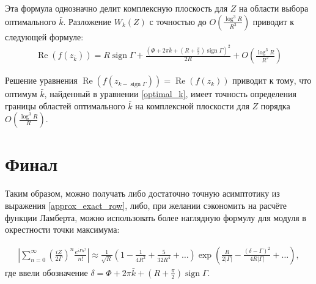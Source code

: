 \documentclass[a4paper, 12pt]{article}
\DeclareMathOperator*{\sign}{sign}
\DeclareMathOperator*{\Real}{Re}
\newenvironment{eqw}{\begin{equation} \begin{aligned}}   
    {\end{aligned}    \end{equation}}
\begin{document}
Эта формула однозначно делит комплексную плоскость для $Z$ на области выбора оптимального $\bar k$. Разложение $W_{k}(Z)$ с точностью до $O\left(\frac{\log^3 R}{R^3}\right)$ приводит к следующей формуле:
\begin{eqw}
    \Real(f(z_{\bar k})) =  R\sign \Gamma + \frac{\left(\Phi + 2\pi \bar k +  \left(R+\frac{\pi}{2} \right)\sign\Gamma\right)^2}{2R} +
     O\left(\frac{\log^3 R}{R^2}\right)
\end{eqw}

Решение уравнения $\Real(f(z_{k-\sign \Gamma})) = \Real(f(z_{k}))$ приводит к тому, что оптимум $\bar k$, найденный в уравнении \eqref{optimal_k}, имеет точность определения границы областей оптимального $\bar k$ на комплексной плоскости для $Z$ порядка $O\left(\frac{\log^3 R}{R}\right)$.

\section*{Финал}
Таким образом, можно получать либо достаточно точную асимптотику из выражения \eqref{approx_exact_row}, либо, при желании сэкономить на расчёте функции Ламберта, можно использовать более наглядную формулу для модуля в окрестности точки максимума:

\begin{eqw}
    \left|\sum\limits_{n=0}^{\infty}\left(\frac{iZ}{2\Gamma}\right)^n  \frac{e^{i\Gamma n^2}}{n!} \right|\approx 
    \frac{1}{\sqrt{R}}\left(1-\frac{1}{4 R^2} + \frac{5}{32 R^4}+\dots\right)
    \exp\left(\frac{R}{2|\Gamma|} - \frac{\left(\delta -\Gamma\right)^2}{4R|\Gamma|}+\dots\right),
\end{eqw}
где ввели обозначение $\delta = \Phi + 2\pi \bar k +  \left(R+\frac{\pi}{2} \right)\sign\Gamma$.

\nocite{*}

\end{document}
